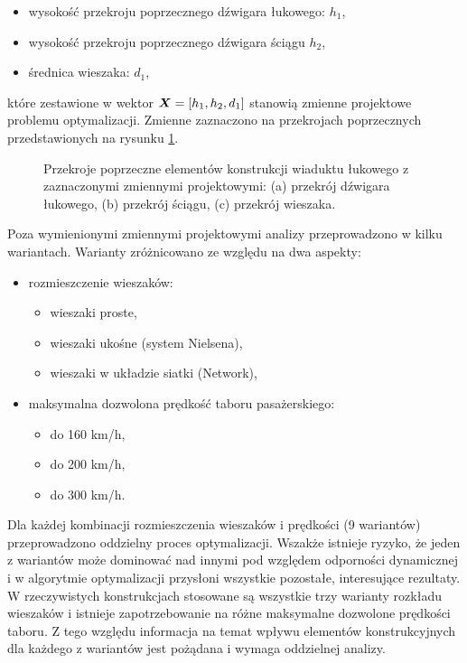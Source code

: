 \begin{itemize}
	\item wysokość przekroju poprzecznego dźwigara łukowego: $h_1$,
	\item wysokość przekroju poprzecznego dźwigara ściągu $h_2$,
	\item średnica wieszaka: $d_1$,
\end{itemize}
które zestawione w wektor $\bm{X}=[h_1,h_2,d_1]$ stanowią zmienne projektowe problemu optymalizacji. Zmienne zaznaczono na przekrojach poprzecznych przedstawionych na rysunku \ref{fig:wk2_opti_cs_elements}.
\begin{figure}[hbt!]
	\centering
	 \quad
	 \quad
	\captionsetup{justification=centering}
	\caption{Przekroje poprzeczne elementów konstrukcji wiaduktu łukowego z zaznaczonymi zmiennymi projektowymi: (a) przekrój dźwigara łukowego, (b) przekrój ściągu, (c) przekrój wieszaka.}
	\label{fig:wk2_opti_cs_elements}
\end{figure}

Poza wymienionymi zmiennymi projektowymi analizy przeprowadzono w kilku wariantach. Warianty zróżnicowano ze względu na dwa aspekty:
\begin{itemize}
	\item rozmieszczenie wieszaków: 
	\begin{itemize}
		\item wieszaki proste,
		\item wieszaki ukośne (system Nielsena), 
		\item wieszaki w układzie siatki (Network),
	\end{itemize}
	\item maksymalna dozwolona prędkość taboru pasażerskiego:
	\begin{itemize}
		\item do 160 km/h, 
		\item do 200 km/h,
		\item do 300 km/h.
	\end{itemize} 
\end{itemize}

Dla każdej kombinacji rozmieszczenia wieszaków i prędkości (9 wariantów) przeprowadzono oddzielny proces optymalizacji. Wszakże istnieje ryzyko, że jeden z wariantów może dominować nad innymi pod względem odporności dynamicznej i w algorytmie optymalizacji przysłoni wszystkie pozostałe, interesujące rezultaty. W rzeczywistych konstrukcjach stosowane są wszystkie trzy warianty rozkładu wieszaków i istnieje zapotrzebowanie na różne maksymalne dozwolone prędkości taboru. Z tego względu informacja na temat wpływu elementów konstrukcyjnych dla każdego z wariantów jest pożądana i wymaga oddzielnej analizy.

